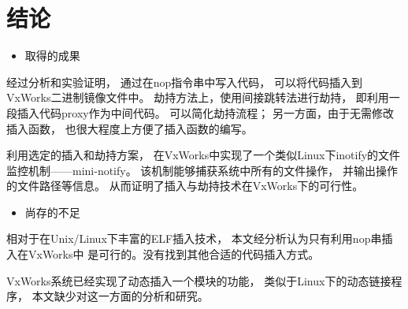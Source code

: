 \chapter*{结论}

\begin{itemize}
  \item 取得的成果
\end{itemize}

经过分析和实验证明，
通过在nop指令串中写入代码，
可以将代码插入到VxWorks二进制镜像文件中。
劫持方法上，使用间接跳转法进行劫持，
即利用一段插入代码proxy作为中间代码。
可以简化劫持流程；
另一方面，由于无需修改插入函数，
也很大程度上方便了插入函数的编写。


利用选定的插入和劫持方案，
在VxWorks中实现了一个类似Linux下inotify的文件监控机制——mini-notify。
该机制能够捕获系统中所有的文件操作，
并输出操作的文件路径等信息。
从而证明了插入与劫持技术在VxWorks下的可行性。

\begin{itemize}
  \item 尚存的不足
\end{itemize}

相对于在Unix/Linux下丰富的ELF插入技术，
本文经分析认为只有利用nop串插入在VxWorks中
是可行的。没有找到其他合适的代码插入方式。

VxWorks系统已经实现了动态插入一个模块的功能，
类似于Linux下的动态链接程序，
本文缺少对这一方面的分析和研究。


\cleardoublepage
